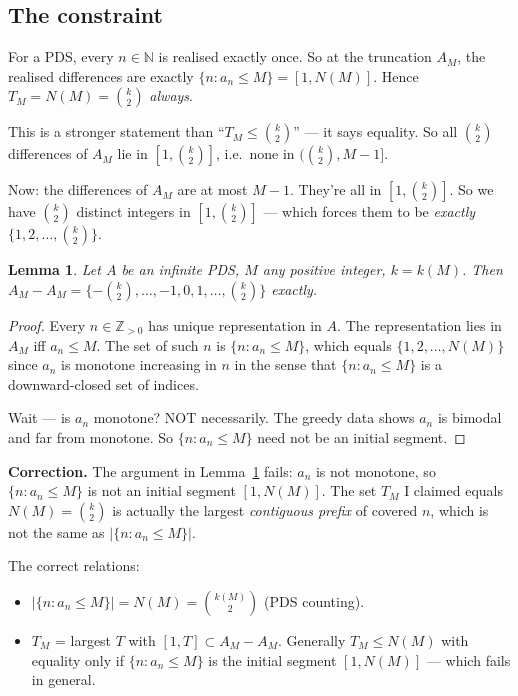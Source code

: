 \documentclass[11pt]{article}
\newtheorem{lemma}{Lemma}
\begin{document}
\subsection{The constraint}

For a PDS, every $n \in \mathbb{N}$ is realised exactly once. So at the
truncation $A_M$, the realised differences are exactly
$\{n : a_n \leq M\} = [1, N(M)]$. Hence $T_M = N(M) = \binom{k}{2}$
\emph{always}.

This is a stronger statement than ``$T_M \leq \binom{k}{2}$'' --- it
says equality. So all $\binom{k}{2}$ differences of $A_M$ lie in
$[1, \binom{k}{2}]$, i.e.\ none in $(\binom{k}{2}, M-1]$.

Now: the differences of $A_M$ are at most $M - 1$. They're all in
$[1, \binom{k}{2}]$. So we have $\binom{k}{2}$ distinct integers in
$[1, \binom{k}{2}]$ --- which forces them to be \emph{exactly}
$\{1, 2, \ldots, \binom{k}{2}\}$.

\begin{lemma}\label{lem:perfect}
Let $A$ be an infinite PDS, $M$ any positive integer, $k = k(M)$. Then
$A_M - A_M = \{-\binom{k}{2}, \ldots, -1, 0, 1, \ldots, \binom{k}{2}\}$
\emph{exactly}.
\end{lemma}

\begin{proof}
Every $n \in \mathbb{Z}_{>0}$ has unique representation in $A$. The
representation lies in $A_M$ iff $a_n \leq M$. The set of such $n$ is
$\{n : a_n \leq M\}$, which equals $\{1, 2, \ldots, N(M)\}$ since $a_n$
is monotone increasing in $n$ in the sense that
$\{n: a_n \leq M\}$ is a downward-closed set of indices.

Wait --- is $a_n$ monotone? NOT necessarily. The greedy data shows
$a_n$ is bimodal and far from monotone. So
$\{n : a_n \leq M\}$ need not be an initial segment.
\end{proof}

\textbf{Correction.} The argument in Lemma~\ref{lem:perfect} fails:
$a_n$ is not monotone, so $\{n : a_n \leq M\}$ is not an initial
segment $[1, N(M)]$. The set $T_M$ I claimed equals $N(M) = \binom{k}{2}$
is actually the largest \emph{contiguous prefix} of covered $n$, which is
not the same as $|\{n: a_n \leq M\}|$.

The correct relations:
\begin{itemize}
\item $|\{n : a_n \leq M\}| = N(M) = \binom{k(M)}{2}$ \quad (PDS counting).
\item $T_M$ = largest $T$ with $[1, T] \subset A_M - A_M$. Generally
      $T_M \leq N(M)$ with equality only if $\{n : a_n \leq M\}$ is the
      initial segment $[1, N(M)]$ --- which fails in general.
\end{itemize}
\end{document}
